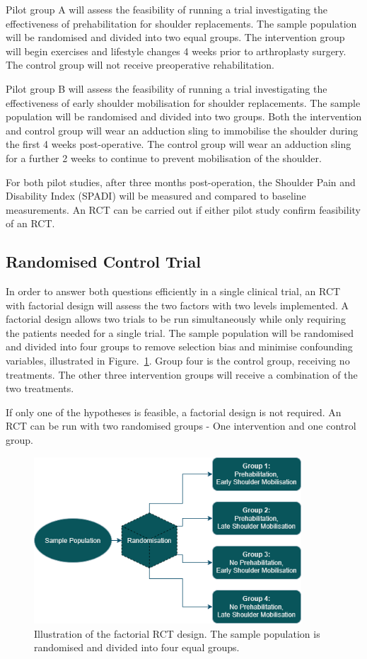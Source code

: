 \documentclass[conference]{IEEEtran}
\begin{document}
Pilot group A will assess the feasibility of running a trial investigating the effectiveness of prehabilitation for shoulder replacements. The sample population will be randomised and divided into two equal groups. The intervention group will begin exercises and lifestyle changes 4 weeks prior to arthroplasty surgery. The control group will not receive preoperative rehabilitation.

Pilot group B will assess the feasibility of running a trial investigating the effectiveness of early shoulder mobilisation for shoulder replacements. The sample population will be randomised and divided into two groups. Both the intervention and control group will wear an adduction sling to immobilise the shoulder during the first 4 weeks post-operative. The control group will wear an adduction sling for a further 2 weeks to continue to prevent mobilisation of the shoulder.

For both pilot studies, after three months post-operation, the Shoulder Pain and Disability Index (SPADI) will be measured and compared to baseline measurements. An RCT can be carried out if either pilot study confirm feasibility of an RCT.

\subsection{Randomised Control Trial}

In order to answer both questions efficiently in a single clinical trial, an RCT with factorial design will assess the two factors with two levels implemented. A factorial design allows two trials to be run simultaneously while only requiring the patients needed for a single trial. The sample population will be randomised and divided into four groups to remove selection bias and minimise confounding variables, illustrated in Figure.~\ref{fig:RCTGroups}. Group four is the control group, receiving no treatments. The other three intervention groups will receive a combination of the two treatments.

If only one of the hypotheses is feasible, a factorial design is not required. An RCT can be run with two randomised groups - One intervention and one control group.

\begin{figure}[h]
\centering
\includegraphics[width=10cm]{images/Clinical trial groups.drawio.png}
\caption{Illustration of the factorial RCT design. The sample population is randomised and divided into four equal groups.}
\label{fig:RCTGroups}
\end{figure}
\end{document}
